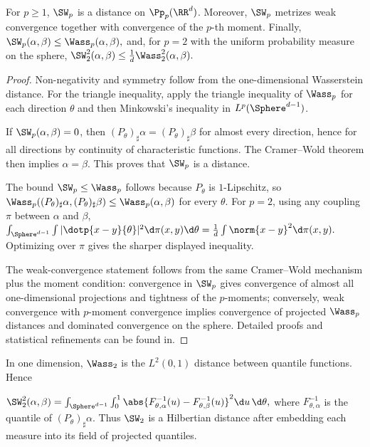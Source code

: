 \begin{prop}\label{prop-sliced-wasserstein-metric}
For $p\geq1$, $\SW_p$ is a distance on $\Pp_p(\RR^d)$. Moreover, $\SW_p$ metrizes weak convergence together with convergence of the $p$-th moment. Finally, \(\SW_p(\alpha,\beta)\leq \Wass_p(\alpha,\beta),\)
and, for $p=2$ with the uniform probability measure on the sphere, \(\SW_2^2(\alpha,\beta)\leq \frac1d \Wass_2^2(\alpha,\beta).\)
\end{prop}
\begin{proof}
Non-negativity and symmetry follow from the one-dimensional Wasserstein distance. For the triangle inequality, apply the triangle inequality of $\Wass_p$ for each direction $\theta$ and then Minkowski's inequality in $L^p(\Sphere^{d-1})$.

If $\SW_p(\alpha,\beta)=0$, then $(P_\theta)_\sharp\alpha=(P_\theta)_\sharp\beta$ for almost every direction, hence for all directions by continuity of characteristic functions. The Cramer--Wold theorem then implies $\alpha=\beta$. This proves that $\SW_p$ is a distance.

The bound $\SW_p\leq\Wass_p$ follows because $P_\theta$ is $1$-Lipschitz, so
\(\Wass_p((P_\theta)_\sharp\alpha,(P_\theta)_\sharp\beta) \leq \Wass_p(\alpha,\beta)\)
for every $\theta$. For $p=2$, using any coupling $\pi$ between $\alpha$ and $\beta$, \(\int_{\Sphere^{d-1}}\int |\dotp{x-y}{\theta}|^2\d\pi(x,y)\d\theta = \frac1d\int\norm{x-y}^2\d\pi(x,y).\)
Optimizing over $\pi$ gives the sharper displayed inequality.

The weak-convergence statement follows from the same Cramer--Wold mechanism plus the moment condition: convergence in $\SW_p$ gives convergence of almost all one-dimensional projections and tightness of the $p$-moments; conversely, weak convergence with $p$-moment convergence implies convergence of projected $\Wass_p$ distances and dominated convergence on the sphere. Detailed proofs and statistical refinements can be found in.
\end{proof}
\begin{rem}
In one dimension, $\Wass_2$ is the $L^2(0,1)$ distance between quantile functions. Hence

\(\SW_2^2(\alpha,\beta) = \int_{\Sphere^{d-1}} \int_0^1 \abs{F^{-1}_{\theta,\alpha}(u)-F^{-1}_{\theta,\beta}(u)}^2 \d u\,\d\theta,\)
where $F^{-1}_{\theta,\alpha}$ is the quantile of $(P_\theta)_\sharp\alpha$. Thus $\SW_2$ is a Hilbertian distance after embedding each measure into its field of projected quantiles.

\end{rem}
